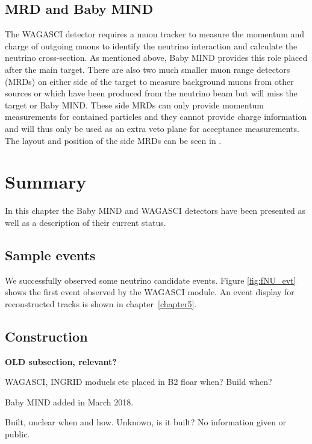 \subsection{MRD and Baby MIND}
The WAGASCI detector requires a muon tracker to measure the momentum and charge of outgoing muons to identify the neutrino interaction and calculate the neutrino cross-section. As mentioned above, Baby MIND provides this role placed after the main target. There are also two much smaller muon range detectors (MRDs) on either side of the target to measure background muons from other sources or which have been produced from the neutrino beam but will miss the target or Baby MIND. These side MRDs can only provide momentum measurements for contained particles and they cannot provide charge information and will thus only be used as an extra veto plane for acceptance measurements. The layout and position of the side MRDs can be seen in . 

\section{Summary}
In this chapter the Baby MIND and WAGASCI detectors have been presented as well as a description of their current status.

\subsection{Sample events}

We successfully observed some neutrino candidate events. Figure \ref{fig:fNU_evt} shows the first event observed by the WAGASCI module. An event display for reconstructed tracks is shown in chapter~\ref{chapter5}.


\subsection{Construction}

\textbf{OLD subsection, relevant?}

WAGASCI, INGRID moduels etc placed in B2 floar when? Build when?

Baby MIND added in March 2018.

Built, unclear when and how.
Unknown, is it built? No information given or public.

